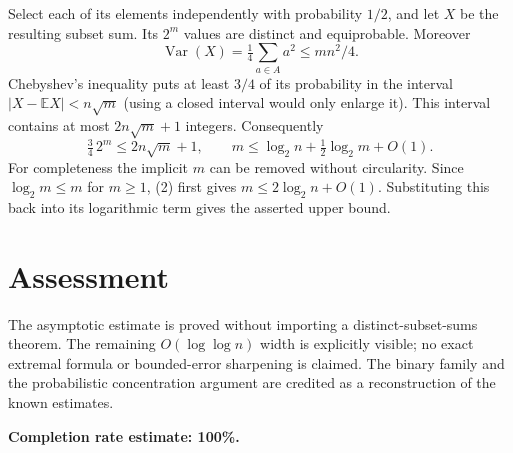 \documentclass[11pt]{article}
\begin{document}
Select each of its elements independently with probability $1/2$, and let $X$ be the resulting subset sum. Its $2^m$ values are distinct and equiprobable. Moreover
\[
 \operatorname{Var}(X)=\tfrac14\sum_{a\in A}a^2\le mn^2/4.
\]
Chebyshev's inequality puts at least $3/4$ of its probability in the interval $|X-\mathbb EX|<n\sqrt m$ (using a closed interval would only enlarge it). This interval contains at most $2n\sqrt m+1$ integers. Consequently
\[
 \tfrac34\,2^m\le2n\sqrt m+1,\qquad
 m\le\log_2 n+\tfrac12\log_2 m+O(1).\tag{2}
\]
For completeness the implicit $m$ can be removed without circularity. Since $\log_2 m\le m$ for $m\ge1$, (2) first gives $m\le2\log_2 n+O(1)$. Substituting this back into its logarithmic term gives the asserted upper bound.

\section*{Assessment}
The asymptotic estimate is proved without importing a distinct-subset-sums theorem. The remaining $O(\log\log n)$ width is explicitly visible; no exact extremal formula or bounded-error sharpening is claimed. The binary family and the probabilistic concentration argument are credited as a reconstruction of the known estimates.

\textbf{Completion rate estimate: 100\%.}
\end{document}
